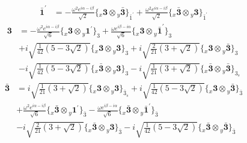 \documentclass[english]{article}
\newcommand{\rep}[1]{\mathbf{#1}}
\newcommand{\repx}[2]{{}_{#2}\mathbf{#1}}
\newcommand{\tsprodx}[2]{\repx{#1}{x}\otimes\repx{#2}{y}}
\newcommand{\subcgt}[3]{\big\{ \tsprodx{#1}{#2}\big\}^{}_{#3}}
\begin{document}
\begin{itemize}
\begin{fleqn}
\begin{align*}
\rep{\bar{1}^{\prime}} & = -\frac{\omega ^2 e^{i \alpha -i \beta }}{\sqrt{2}}\subcgt{3}{\bar{3}}{\bar{1}^{\prime}}+\frac{\omega ^2 e^{i \alpha -i \beta }}{\sqrt{2}}\subcgt{\bar{3}}{3}{\bar{1}^{\prime}}
\end{align*}
\begin{align*}
\rep{3} & = -\frac{\omega ^2 e^{i \alpha -i \beta }}{\sqrt{6}}\subcgt{3}{1^{\prime}}{3}+\frac{\omega  e^{i \beta -i \alpha }}{\sqrt{6}}\subcgt{3}{\bar{1}^{\prime}}{3} \\ 
 & +i \sqrt{\frac{1}{42} \left(5-3 \sqrt{2}\right)}\subcgt{3}{3}{3}+i \sqrt{\frac{2}{21} \left(3+\sqrt{2}\right)}\subcgt{3}{\bar{3}}{3} \\ 
 & -i \sqrt{\frac{1}{42} \left(5-3 \sqrt{2}\right)}\subcgt{\bar{3}}{3}{3}-i \sqrt{\frac{1}{21} \left(3+\sqrt{2}\right)}\subcgt{\bar{3}}{\bar{3}}{3_{s}}
\end{align*}
\begin{align*}
\rep{\bar{3}} & = i \sqrt{\frac{1}{21} \left(3+\sqrt{2}\right)}\subcgt{3}{3}{\bar{3}_{s}}+i \sqrt{\frac{1}{42} \left(5-3 \sqrt{2}\right)}\subcgt{3}{\bar{3}}{\bar{3}} \\ 
 & +\frac{\omega ^2 e^{i \alpha -i \beta }}{\sqrt{6}}\subcgt{\bar{3}}{1^{\prime}}{\bar{3}}-\frac{\omega  e^{i \beta -i \alpha }}{\sqrt{6}}\subcgt{\bar{3}}{\bar{1}^{\prime}}{\bar{3}} \\ 
 & -i \sqrt{\frac{2}{21} \left(3+\sqrt{2}\right)}\subcgt{\bar{3}}{3}{\bar{3}}-i \sqrt{\frac{1}{42} \left(5-3 \sqrt{2}\right)}\subcgt{\bar{3}}{\bar{3}}{\bar{3}}
\end{align*}
\end{fleqn}
\end{itemize}
\end{document}
